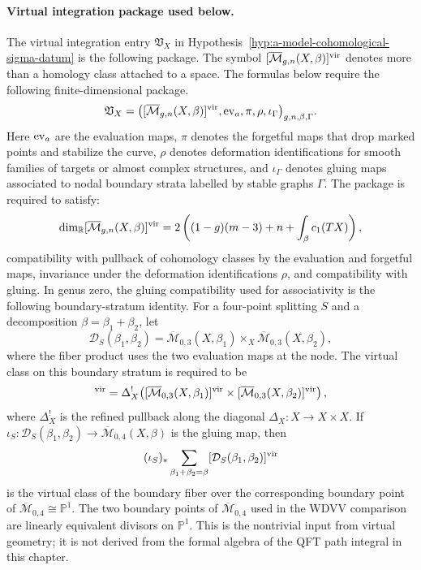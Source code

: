\paragraph{Virtual integration package used below.}
The virtual integration entry \(\mathfrak V_X\) in
Hypothesis~\ref{hyp:a-model-cohomological-sigma-datum} is the following
package.  The symbol
\([\overline{\mathcal M}_{g,n}(X,\beta)]^{\rm vir}\) denotes more than a
homology class attached to a space.  The formulas below require the following
finite-dimensional package.
\[
  \mathfrak V_X
  =
  \bigl(
  [\overline{\mathcal M}_{g,n}(X,\beta)]^{\rm vir},
  {\rm ev}_a,\pi,\rho,\iota_{\Gamma}
  \bigr)_{g,n,\beta,\Gamma}.
\]
Here \({\rm ev}_a\) are the evaluation maps, \(\pi\) denotes the forgetful
maps that drop marked points and stabilize the curve, \(\rho\) denotes
deformation identifications for smooth families of targets or almost complex
structures, and \(\iota_{\Gamma}\) denotes gluing maps associated to nodal
boundary strata labelled by stable graphs \(\Gamma\).  The package is
required to satisfy:
\[
  \dim_{\mathbb R}
  [\overline{\mathcal M}_{g,n}(X,\beta)]^{\rm vir}
  =
  2\left((1-g)(m-3)+n+\int_\beta c_1(TX)\right),
\]
compatibility with pullback of cohomology classes by the evaluation and
forgetful maps, invariance under the deformation identifications \(\rho\),
and compatibility with gluing.  In genus zero, the gluing compatibility used
for associativity is the following boundary-stratum identity.  For a
four-point splitting \(S\) and a decomposition
\(\beta=\beta_1+\beta_2\), let
\[
  \mathcal D_S(\beta_1,\beta_2)
  =
  \overline{\mathcal M}_{0,3}(X,\beta_1)
  \times_X
  \overline{\mathcal M}_{0,3}(X,\beta_2),
\]
where the fiber product uses the two evaluation maps at the node.  The
virtual class on this boundary stratum is required to be
\begin{equation}
  [\mathcal D_S(\beta_1,\beta_2)]^{\rm vir}
  =
  \Delta_X^!\!\left(
  [\overline{\mathcal M}_{0,3}(X,\beta_1)]^{\rm vir}
  \times
  [\overline{\mathcal M}_{0,3}(X,\beta_2)]^{\rm vir}
  \right),
  \label{eq:gw-virtual-splitting-package}
\end{equation}
where \(\Delta_X^!\) is the refined pullback along the diagonal
\(\Delta_X:X\to X\times X\).  If
\(\iota_S:\mathcal D_S(\beta_1,\beta_2)\to
\overline{\mathcal M}_{0,4}(X,\beta)\) is the gluing map, then
\[
  (\iota_S)_*
  \sum_{\beta_1+\beta_2=\beta}
  [\mathcal D_S(\beta_1,\beta_2)]^{\rm vir}
\]
is the virtual class of the boundary fiber over the corresponding boundary
point of
\(\overline{\mathcal M}_{0,4}\cong\mathbb P^1\).  The two boundary points of
\(\overline{\mathcal M}_{0,4}\) used in the WDVV comparison are linearly
equivalent divisors on \(\mathbb P^1\).  This is the nontrivial input from
virtual geometry; it is not derived from the formal algebra of the QFT path
integral in this chapter.

